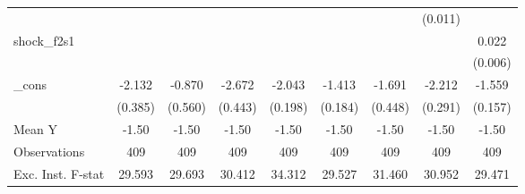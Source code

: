 {\begin{tabular}{l*{8}{c}}
            &                     &                     &                     &                     &                     &                     &     (0.011)         &                     \\
\addlinespace
shock\_f2s1  &                     &                     &                     &                     &                     &                     &                     &       0.022\sym{***}\\
            &                     &                     &                     &                     &                     &                     &                     &     (0.006)         \\
\addlinespace
\_cons      &      -2.132\sym{***}&      -0.870         &      -2.672\sym{***}&      -2.043\sym{***}&      -1.413\sym{***}&      -1.691\sym{***}&      -2.212\sym{***}&      -1.559\sym{***}\\
            &     (0.385)         &     (0.560)         &     (0.443)         &     (0.198)         &     (0.184)         &     (0.448)         &     (0.291)         &     (0.157)         \\
\midrule
Mean Y      &       -1.50         &       -1.50         &       -1.50         &       -1.50         &       -1.50         &       -1.50         &       -1.50         &       -1.50         \\
Observations&         409         &         409         &         409         &         409         &         409         &         409         &         409         &         409         \\
Exc. Inst. F-stat&      29.593         &      29.693         &      30.412         &      34.312         &      29.527         &      31.460         &      30.952         &      29.471         \\
\bottomrule
\end{tabular}
}

